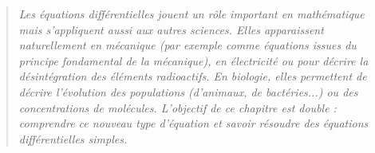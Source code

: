 \documentclass[11pt,a4paper]{report}
\begin{document}



\bigskip
\bigskip

\begin{quote}
\center
\emph{
Les équations différentielles jouent un rôle important en mathématique mais s'appliquent aussi aux autres sciences. Elles apparaissent naturellement en mécanique (par exemple comme équations issues du principe fondamental de la mécanique), en électricité ou pour décrire la désintégration des éléments radioactifs. En biologie, elles permettent de décrire l'évolution des populations (d'animaux, de bactéries...) ou des concentrations de molécules.
L'objectif de ce chapitre est double : comprendre ce nouveau type d'équation et savoir résoudre des équations différentielles simples.
}
\end{quote}

\bigskip
\bigskip
\end{document}
